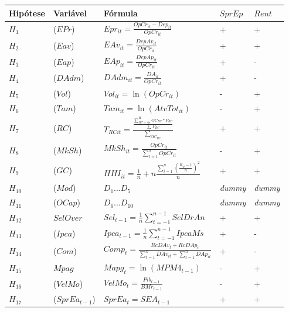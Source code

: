 \documentclass[
  12pt,
  12pt,
  openright,
  oneside,
  a4paper,
  chapter=TITLE,
  section=TITLE,
  subsection=TITLE,
  subsubsection=TITLE,
  english,
  portugues,
  sumario=tradicional]{abntex2}
\begin{document}
\begin{longtable}[]{@{}
  >{\centering\arraybackslash}p{}
  >{\raggedright\arraybackslash}p{}
  >{\raggedright\arraybackslash}p{}
  >{\centering\arraybackslash}p{}
  >{\centering\arraybackslash}p{}@{}}
\toprule
Hipótese & Variável & Fórmula & \(SprEp\) & \(Rent\) \\
\midrule
\endhead
\(H_{1}\) & (\(EPr\)) & \(Epr_{it} = \frac{OpCr_{it} - Dep_{it}}{OpCr_{it}}\) & + & + \\
\(H_{2}\) & (\(Eav\)) & \(EAv_{it} = \frac{DepAv_{it}}{OpCr_{it}}\) & + & + \\
\(H_{3}\) & (\(Eap\)) & \(EAp_{it} = \frac{DepAp_{it}}{OpCr_{it}}\) & + & - \\
\(H_{4}\) & (\(DAdm\)) & \(DAdm_{it} = \frac{DA_{it}}{OpCr_{it}}\) & + & - \\
\(H_{5}\) & (\(Vol\)) & \(Vol_{it} = \ln(OpCr_{it})\) & - & + \\
\(H_{6}\) & (\(Tam\)) & \(Tam_{it} = \ln(AtvTot_{it})\) & - & + \\
\(H_{7}\) & (\(RC\)) & \(T_{RCit} = \frac{\frac{\sum_{RC = Aa}^HOC_{RC}*P_{RC}}{\sum_{}P_{RC}}}{\sum_{OC_{RC}}}\) & + & + \\
\(H_{8}\) & (\(MkSh\)) & \(MkSh_{it} = \frac{OpCr_{it}}{\sum_{t=1}^nOpCr_{it}}\) & - & + \\
\(H_{9}\) & (\(GC\)) & \(HHI_{it} = \frac{1}{n} + n\frac{\sum_{i=1}^{n}(\frac{R_{it} - 1}{n})^2}{n}\) & + & + \\
\(H_{10}\) & (\(Mod\)) & \(D_{1}...D_{5}\) & \emph{dummy} & \emph{dummy} \\
\(H_{11}\) & (\(OCap\)) & \(D_{6}...D_{10}\) & \emph{dummy} & \emph{dummy} \\
\(H_{12}\) & \(SelOver\) & \(Sel_{t-1} = \frac{1}{n}\sum_{t=-1}^{n-1}SelDrAn\) & + & + \\
\(H_{13}\) & (\(Ipca\)) & \(Ipca_{t-1} = \frac{1}{n}\sum_{t=-1}^{n-1}IpcaMs\) & + & - \\
\(H_{14}\) & (\(Com\)) & \(Comp_{t} = \frac{RcDAv_{t} + RcDAp_{t}}{\sum_{t=1}^{n}DAv_{it} + \sum_{t=1}^{n}DAp_{it}}\) & + & - \\
\(H_{15}\) & \(Mpag\) & \(Mapg_{t} = \ln(MPM4_{t-1})\) & - & + \\
\(H_{16}\) & (\(VelMo\)) & \(VelMo_{t} = \frac{Pib_{t-1}}{BMr_{t-1}}\) & - & + \\
\(H_{17}\) & (\(SprEa_{t-1}\)) & \(SprEa_{t} = SEA_{t-1}\) & + & + \\
\bottomrule
\end{longtable}
\end{document}

